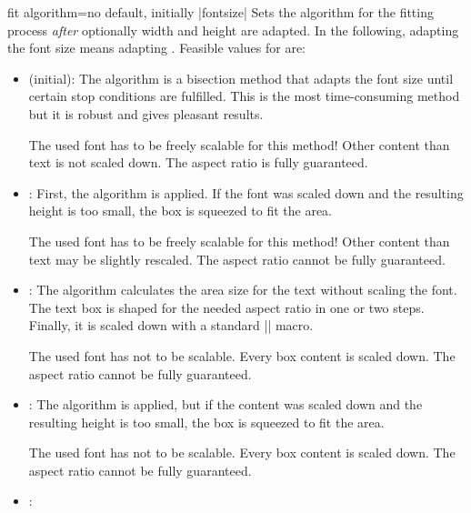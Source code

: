\clearpage
\begin{docTcbKey}{fit algorithm}{=}{no default, initially |fontsize|}
Sets the algorithm for the fitting process \emph{after} optionally width and height
are adapted. In the following, adapting the font size means adapting
.
  Feasible values for  are:
  \begin{itemize}
  \item{} (initial):
    The algorithm is a bisection method that adapts the font size until
    certain stop conditions are fulfilled. This is the most time-consuming
    method but it is robust and gives pleasant results.
    \begin{marker}
    The used font has to be freely scalable for this method!
    Other content than text is not scaled down.
    The aspect ratio is fully guaranteed.
    \end{marker}
  \item{}:
    First, the  algorithm is applied. If the font was scaled down
    and the resulting height is too small, the box is squeezed to fit the area.
    \begin{marker}
    The used font has to be freely scalable for this method!
    Other content than text may be slightly rescaled.
    The aspect ratio cannot be fully guaranteed.
    \end{marker}
  \item{}:
    The algorithm calculates the area size for the text without scaling the font.
    The text box is shaped for the needed aspect ratio in one or two
    steps. Finally, it is scaled down with a standard |\resizebox| macro.
    \begin{marker}
    The used font has not to be scalable. Every box content is scaled down.
    The aspect ratio cannot be fully guaranteed.
    \end{marker}
  \item{}:
    The  algorithm is applied, but if the content was scaled
    down and the resulting height is too small, the box is squeezed to fit the area.
    \begin{marker}
    The used font has not to be scalable. Every box content is scaled down.
    The aspect ratio cannot be fully guaranteed.
    \end{marker}
  \item{}:

\end{itemize}
\end{docTcbKey}
